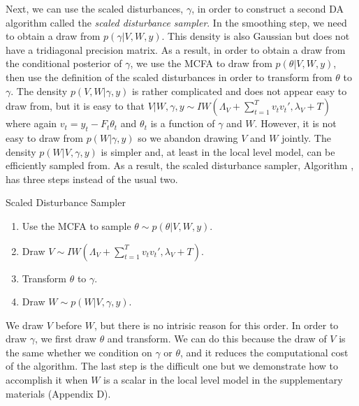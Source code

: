 \documentclass[12pt]{article}
\begin{document}
Next, we can use the scaled disturbances, $\gamma$, in order to construct a second DA algorithm called the {\it scaled disturbance sampler}. In the smoothing step, we need to obtain a draw from $p(\gamma|V,W,y)$. This density is also Gaussian but does not have a tridiagonal precision matrix. As a result, in order to obtain a draw from the conditional posterior of $\gamma$, we use the MCFA to draw from $p(\theta|V,W,y)$, then use the definition of the scaled disturbances in order to transform from $\theta$ to $\gamma$. The density $p(V,W|\gamma,y)$ is rather complicated and does not appear easy to draw from, but it is easy to that $V|W,\gamma,y \sim IW\left(\Lambda_V + \sum_{t=1}^Tv_tv_t',\lambda_V + T\right)$ where again $v_t = y_t - F_t\theta_t$ and $\theta_t$ is a function of $\gamma$ and $W$. However, it is not easy to draw from $p(W|\gamma,y)$ so we abandon drawing $V$ and $W$ jointly. The density $p(W|V,\gamma,y)$ is simpler and, at least in the local level model, can be efficiently sampled from. As a result, the scaled disturbance sampler, Algorithm , has three steps instead of the usual two. 
\begin{alg*}[SD]Scaled Disturbance Sampler\label{alg:DLMdist}
\begin{enumerate}
\item Use the MCFA to sample $\theta \sim p(\theta|V,W,y)$.
\item Draw $V \sim IW\left(\Lambda_V + \sum_{t=1}^Tv_tv_t',\lambda_V + T\right)$.
\item Transform $\theta$ to $\gamma$.
\item Draw $W \sim p(W|V,\gamma,y)$.
\end{enumerate}
\end{alg*}\noindent
We draw $V$ before $W$, but there is no intrisic reason for this order. In order to draw $\gamma$, we first draw $\theta$ and transform. We can do this because the draw of $V$ is the same whether we condition on $\gamma$ or $\theta$, and it reduces the computational cost of the algorithm. The last step is the difficult one but we demonstrate how to accomplish it when $W$ is a scalar in the local level model in the supplementary materials (Appendix D).
\end{document}
